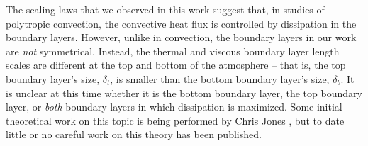 The scaling laws that we observed in this work suggest that, in studies of polytropic convection, the convective heat flux is controlled by dissipation in the boundary layers.
However, unlike in \RB convection, the boundary layers in our work are \emph{not} symmetrical.
Instead, the thermal and viscous boundary layer length scales are different at the top and bottom of the atmosphere -- that is, the top boundary layer's size, $\delta_t$, is smaller than the bottom boundary layer's size, $\delta_b$.
It is unclear at this time whether it is the bottom boundary layer, the top boundary layer, or \emph{both} boundary layers in which dissipation is maximized.
Some initial theoretical work on this topic is being performed by Chris Jones \citep[as presented in ][]{jones&all2019}, but to date little or no careful work on this theory has been published.
